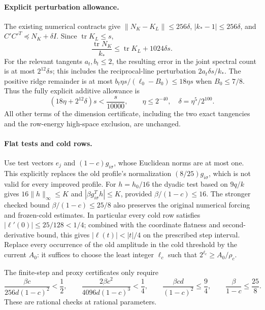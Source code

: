 \documentclass[11pt]{amsart}
\theoremstyle{remark}\newtheorem{remark}[theorem]{Remark}
\begin{document}
\paragraph{Explicit perturbation allowance.}
The existing numerical contracts give
$\|N_K-K_L\|\le256\delta$, $|k_*-1|\le256\delta$, and
$C'C'^T\preceq N_K+\delta I$. Since $\operatorname{tr}K_L\le s$,
\[
 \frac{\operatorname{tr}N_K}{k_*}
 \le\operatorname{tr}K_L+1024\delta s.
\]
For the relevant tangents $a_t,b_t\le2$, the resulting error in the
joint spectral count is at most $2^{12}\delta s$; this includes the
reciprocal-line perturbation $2a_t\delta s/k_*$.
The positive ridge remainder is at most
$b_t\eta s/(\ell_0-B_0)\le18\eta s$ when $B_0\le7/8$.
Thus the fully explicit additive allowance is
\[
 (18\eta+2^{12}\delta)s<\frac{s}{10000},
 \qquad \eta\le2^{-40},\quad\delta=\eta^5/2^{100}.
\]
All other terms of the dimension certificate, including the two exact
tangencies and the row-energy high-space exclusion, are unchanged.

\paragraph{Flat tests and cold rows.}
Use test vectors $e_j$ and $(1-c)g_{i\sigma}$, whose Euclidean norms are
at most one. This explicitly replaces the old profile's normalization
$(8/25)g_{i\sigma}$, which is not valid for every improved profile.
For $h=h_0/16$ the dyadic test based on $9q/k$ gives
$16\|h\|_\infty\le K$ and $|\beta g_{i\sigma}^Th|\le K$, provided
$\beta/(1-c)\le16$. The stronger checked bound
$\beta/(1-c)\le25/8$ also preserves the original numerical forcing
and frozen-cold estimates. In particular every cold row satisfies
$|\ell'(0)|\le25/128<1/4$; combined with the coordinate flatness and
second-derivative bound, this gives $|\ell(t)|<|t|/4$ on the prescribed
step interval. Replace every occurrence of the old amplitude in the
cold threshold by the current $A_0$: it suffices to choose the least
integer $\ell_c$ such that $2^{\ell_c}\ge A_0/\rho_c$.

The finite-step and proxy certificates only require
\[
 \frac{\beta c}{256d(1-c)^2}<\frac12,\qquad
 \frac{2\beta c^2}{4096d(1-c)^3}<\frac14,\qquad
 \frac{\beta cd}{(1-c)^2}\le\frac94,
 \qquad \frac\beta{1-c}\le\frac{25}{8}.
\]
These are rational checks at rational parameters.
\end{document}
